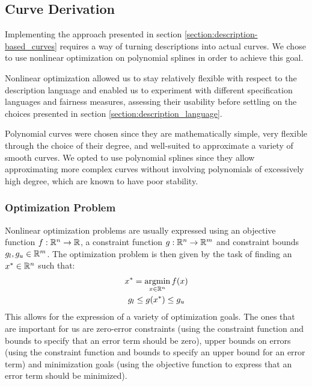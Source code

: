 \documentclass[a4paper]{article}
\begin{document}
		\subsection{Curve Derivation}
		\label{section:curve_derivation}

			Implementing the approach presented in section \ref{section:description-based_curves} requires a way of turning descriptions into actual curves. We chose to use nonlinear optimization on polynomial splines in order to achieve this goal.

			Nonlinear optimization allowed us to stay relatively flexible with respect to the description language and enabled us to experiment with different specification languages and fairness measures, assessing their usability before settling on the choices presented in section \ref{section:description_language}.

			Polynomial curves were chosen since they are mathematically simple, very flexible through the choice of their degree, and well-suited to approximate a variety of smooth curves. We opted to use polynomial splines since they allow approximating more complex curves without involving polynomials of excessively high degree, which are known to have poor stability.

			\subsubsection{Optimization Problem}
			\label{section:optimization_problem}

				Nonlinear optimization problems are usually expressed using an objective function \(f : \mathbb{R}^{n} \rightarrow \mathbb{R}\), a constraint function \(g : \mathbb{R}^{n} \rightarrow \mathbb{R}^{m}\) and constraint bounds \(g_l, g_u \in \mathbb{R}^{m}\). The optimization problem is then given by the task of finding an \(x^* \in \mathbb{R}^{n}\) such that:
				\begin{equation*}
					\begin{gathered}
						x^* = \operatorname*{argmin}_{x \in \mathbb{R}^{n}} f\!\left( x \right)\\
						g_l \leq g\!\left( x^* \right) \leq g_u
					\end{gathered}
				\end{equation*}
				This allows for the expression of a variety of optimization goals. The ones that are important for us are zero-error constraints (using the constraint function and bounds to specify that an error term should be zero), upper bounds on errors (using the constraint function and bounds to specify an upper bound for an error term) and minimization goals (using the objective function to express that an error term should be minimized).
\end{document}
